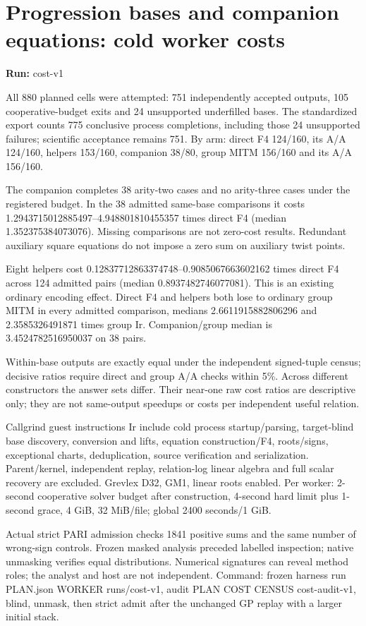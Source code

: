 \documentclass[10pt]{article}
\begin{document}
\section*{Progression bases and companion equations: cold worker costs}
\textbf{Run:} cost-v1\par
All 880 planned cells were attempted: 751 independently accepted outputs, 105 cooperative-budget exits and 24 unsupported underfilled bases. The standardized export counts 775 conclusive process completions, including those 24 unsupported failures; scientific acceptance remains 751. By arm: direct F4 124/160, its A/A 124/160, helpers 153/160, companion 38/80, group MITM 156/160 and its A/A 156/160.

The companion completes 38 arity-two cases and no arity-three cases under the registered budget. In the 38 admitted same-base comparisons it costs 1.2943715012885497–4.948801810455357 times direct F4 (median 1.352375384073076). Missing comparisons are not zero-cost results. Redundant auxiliary square equations do not impose a zero sum on auxiliary twist points.

Eight helpers cost 0.12837712863374748–0.9085067663602162 times direct F4 across 124 admitted pairs (median 0.8937482746077081). This is an existing ordinary encoding effect. Direct F4 and helpers both lose to ordinary group MITM in every admitted comparison, medians 2.6611915882806296 and 2.3585326491871 times group Ir. Companion/group median is 3.4524782516950037 on 38 pairs.

Within-base outputs are exactly equal under the independent signed-tuple census; decisive ratios require direct and group A/A checks within 5\%. Across different constructors the answer sets differ. Their near-one raw cost ratios are descriptive only; they are not same-output speedups or costs per independent useful relation.

Callgrind guest instructions Ir include cold process startup/parsing, target-blind base discovery, conversion and lifts, equation construction/F4, roots/signs, exceptional charts, deduplication, source verification and serialization. Parent/kernel, independent replay, relation-log linear algebra and full scalar recovery are excluded. Grevlex D32, GM1, linear roots enabled. Per worker: 2-second cooperative solver budget after construction, 4-second hard limit plus 1-second grace, 4 GiB, 32 MiB/file; global 2400 seconds/1 GiB.

Actual strict PARI admission checks 1841 positive sums and the same number of wrong-sign controls. Frozen masked analysis preceded labelled inspection; native unmasking verifies equal distributions. Numerical signatures can reveal method roles; the analyst and host are not independent. Command: frozen harness run PLAN.json WORKER runs/cost-v1, audit PLAN COST CENSUS cost-audit-v1, blind, unmask, then strict admit after the unchanged GP replay with a larger initial stack.
\end{document}
